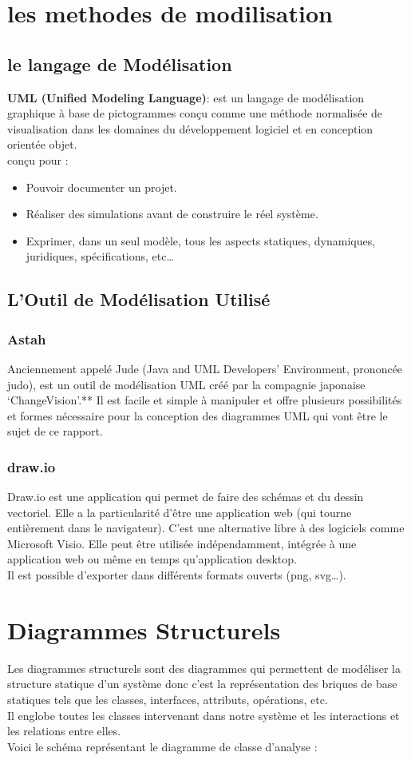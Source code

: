 \documentclass[11pt,fleqn]{book} %
\begin{document}
\section{les methodes de modilisation}
\subsection{le langage de Modélisation}
\hspace{0.5cm} \textbf{UML (Unified Modeling Language)}: est un langage de modélisation graphique à base de pictogrammes conçu comme une méthode normalisée de visualisation dans les domaines du développement logiciel et en conception orientée objet.\\
conçu pour :
\begin{itemize}
    \item Pouvoir documenter un projet.
    \item Réaliser des simulations avant de construire le réel système.
    \item Exprimer, dans un seul modèle, tous les aspects statiques, dynamiques, juridiques, spécifications, etc…
\end{itemize}
\subsection{ L’Outil de Modélisation Utilisé}
\subsubsection{Astah}
Anciennement appelé Jude (Java and UML Developers’ 
Environment, prononcée judo), est un outil de modélisation UML créé par la compagnie japonaise ‘ChangeVision’.**
Il est facile et simple à manipuler et offre plusieurs possibilités et formes nécessaire pour la conception des diagrammes UML qui vont être le sujet de ce rapport.
\subsubsection{draw.io}
 Draw.io est une application qui permet de faire des schémas et du dessin vectoriel. Elle a la particularité d'être une application web (qui tourne entièrement dans le navigateur). C'est une alternative libre à des logiciels comme Microsoft Visio. Elle peut être utilisée indépendamment, intégrée à une application web ou même en temps qu'application desktop.\\
 Il est possible d'exporter dans différents formats ouverts (png, svg…). 
\section{ Diagrammes Structurels}
Les diagrammes structurels sont des diagrammes qui permettent de modéliser la structure statique d’un système donc c’est la représentation des briques de base 
statiques tels que les classes, interfaces, attributs, opérations, etc. \\
Il englobe toutes les classes intervenant dans notre système et les interactions et les relations entre elles.\\
Voici le schéma représentant le diagramme de classe d’analyse :
\end{document}
